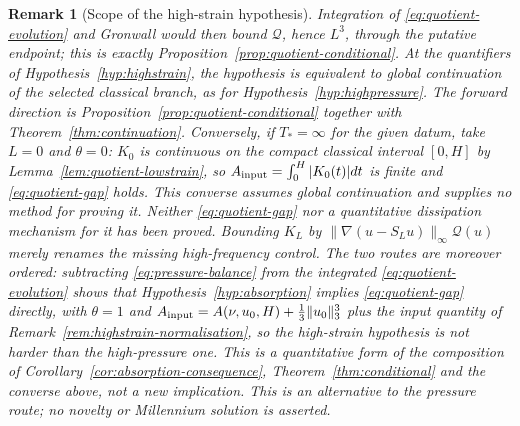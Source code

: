 \documentclass[11pt]{article}
\newtheorem{remark}[theorem]{Remark}
\theoremstyle{definition}
\theoremstyle{plain}
\newcommand{\norm}[1]{\lVert #1\rVert}
\begin{document}
\begin{remark}[Scope of the high-strain hypothesis]\label{rem:highstrain-scope}
Integration of \eqref{eq:quotient-evolution} and Gronwall would then bound
$\mathcal Q$, hence $L^3$, through the putative endpoint; this is exactly
Proposition~\ref{prop:quotient-conditional}.  At the quantifiers of
Hypothesis~\ref{hyp:highstrain}, the hypothesis is equivalent to global
continuation of the selected classical branch, as for
Hypothesis~\ref{hyp:highpressure}.  The forward direction is
Proposition~\ref{prop:quotient-conditional} together with
Theorem~\ref{thm:continuation}.  Conversely, if $T_*=\infty$ for the given
datum, take $L=0$ and $\theta=0$: $K_0$ is continuous on the compact
classical interval $[0,H]$ by Lemma~\ref{lem:quotient-lowstrain}, so
$A_{\rm input}=\int_0^H|K_0(t)|dt$ is finite and \eqref{eq:quotient-gap}
holds.  This converse assumes global continuation and supplies no method
for proving it.  Neither \eqref{eq:quotient-gap} nor a quantitative
dissipation mechanism for it has been proved.  Bounding $K_L$ by
$\norm{\nabla(u-S_Lu)}_\infty\mathcal Q(u)$ merely renames the missing
high-frequency control.  The two routes are moreover ordered: subtracting
\eqref{eq:pressure-balance} from the integrated \eqref{eq:quotient-evolution}
shows that Hypothesis~\ref{hyp:absorption} implies \eqref{eq:quotient-gap}
directly, with $\theta=1$ and
$A_{\rm input}=A(\nu,u_0,H)+\frac13\norm{u_0}_3^3$ plus the input quantity of
Remark~\ref{rem:highstrain-normalisation}, so the high-strain hypothesis is
not harder than the high-pressure one.  This is a quantitative form of the
composition of Corollary~\ref{cor:absorption-consequence},
Theorem~\ref{thm:conditional} and the converse above, not a new implication.
  This is an alternative to the pressure route; no
novelty or Millennium solution is asserted.
\end{remark}
\end{document}

